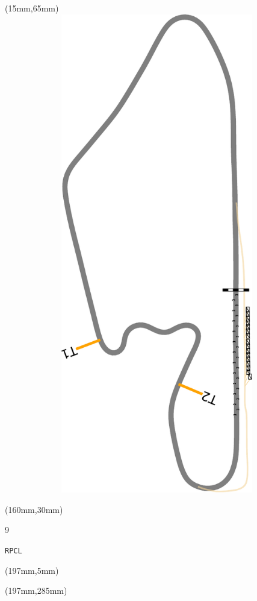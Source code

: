 \begin{textblock*}{185mm}(15mm,65mm)%
\centering
\mbox{\includegraphics[width=185mm,height=210mm,keepaspectratio]{PT/RPCL.pdf}}
\end{textblock*}
\begin{textblock*}{40mm}(160mm,30mm)%
\Large
\par{} 
\par9 
\par\hfill\tiny\tt RPCL\\
\end{textblock*}
\begin{textblock*}{20mm}(197mm,5mm)%
\fbox{\thepage}
\label{RPCL}
\end{textblock*}
\begin{textblock*}{20mm}(197mm,285mm)%
\fbox{\thepage}
\end{textblock*}

